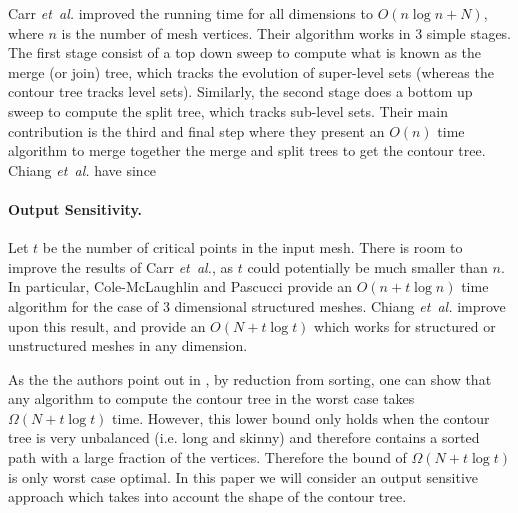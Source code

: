 \documentclass[11pt]{article}
\theoremstyle{definition}
\newcommand{\etal}{\textit{et~al.}\xspace}
\begin{document}
Carr \etal \cite{csa-cctad-00} improved the running time for all dimensions to $O(n\log n + N)$, where $n$ is the number of mesh vertices.  Their algorithm works in 3 simple stages.  The first stage consist of a top down sweep to compute what is known as the merge (or join) tree, which tracks the evolution of super-level sets (whereas the contour tree tracks level sets).  Similarly, the second stage does a bottom up sweep to compute the split tree, which tracks sub-level sets.  Their main contribution is the third and final step where 
they present an $O(n)$ time algorithm to merge together the merge and split trees to get the contour tree.  Chiang \etal \cite{cllr-sooscctmp-05} 
have since 


\paragraph{Output Sensitivity.}
Let $t$ be the number of critical points in the input mesh.  There is room to improve the results of Carr \etal, as $t$ could potentially be much smaller than $n$.  In particular, Cole-McLaughlin and Pascucci \cite{pc-ectls-02} provide an $O(n+t\log n)$ time algorithm for the case of 3 dimensional structured meshes.  Chiang \etal \cite{cllr-sooscctmp-05} improve upon this result, and provide an $O(N+t\log t)$ which works for structured or unstructured meshes in any dimension.  

As the the authors point out in \cite{cllr-sooscctmp-05}, by reduction from sorting, one can show that any algorithm to compute the contour tree in the worst case takes $\Omega(N+t\log t)$ time.  However, this lower bound only holds when the contour tree is very unbalanced (i.e. long and skinny) and therefore contains a sorted path with a large fraction of the vertices.  Therefore the bound of $\Omega(N+t\log t)$ is only worst case optimal.  In this paper we will consider an output sensitive approach which takes into account the shape of the contour tree.
\end{document}
